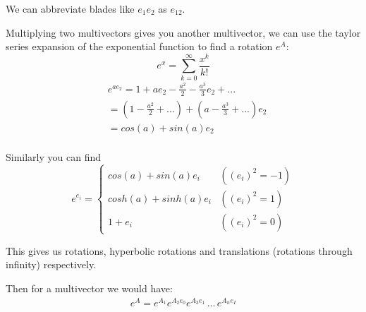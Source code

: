 \documentclass[twoside]{article}
\newcommand{\B}[1]{\left(#1\right)} %
\newcommand{\F}[2]{\frac{#1}{#2}} %
\newcommand{\aside}[1]{\begin{flushright}\scriptsize{#1}\end{flushright}}
\begin{document}
\begin{multicols*}{2}
                \aside{We can abbreviate blades like $ e_1 e_2 $ as $ e_{12} $.}
            \par
                Multiplying two multivectors gives you another multivector,
                we can use the taylor series expansion of the exponential function
                to find a rotation $e^A$:
                $$ e^x = \sum_{k=0}^\infty \F{x^k}{k!} $$
                $$\begin{aligned}
                    &e^{a e_2} = 1 + a e_2 - \F{a^2}{2} - \F{a^3}{3} e_2 + ... \\
                    &= (1 - \F{a^2}{2} + ...) + (a - \F{a^3}{3} + ...) e_2 \\
                    &= cos(a) + sin(a) e_2 \\
                \end{aligned}$$
            \par
                Similarly you can find
                $$ e^{e_i} = \begin{cases}
                    cos(a) + sin(a) e_i & (\B{e_i}^2 = -1) \\
                    cosh(a) + sinh(a) e_i & (\B{e_i}^2 = 1) \\
                    1 + e_i & (\B{e_i}^2 = 0)
                    \end{cases}$$
            \par
                This gives us rotations, hyperbolic rotations and translations (rotations through infinity) respectively.
            \par
                Then for a multivector we would have:
                \begin{gather*}
                    e^A = e^{A_1} e^{A_2 e_0} e^{A_3 e_1} \, ... \, e^{A_n e_I} \\
                \end{gather*}

\end{multicols*}
\end{document}
